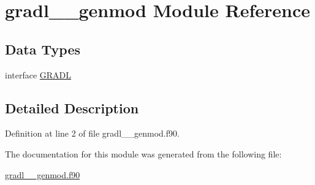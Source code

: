 \hypertarget{classgradl____genmod}{\section{gradl\+\_\+\+\_\+genmod Module Reference}
\label{classgradl____genmod}
}
\subsection*{Data Types}
\begin{DoxyCompactItemize}
\item 
interface \hyperlink{interfacegradl____genmod_1_1GRADL}{G\+R\+A\+D\+L}
\end{DoxyCompactItemize}


\subsection{Detailed Description}


Definition at line 2 of file gradl\+\_\+\+\_\+genmod.\+f90.



The documentation for this module was generated from the following file\+:\begin{DoxyCompactItemize}
\item 
\hyperlink{gradl____genmod_8f90}{gradl\+\_\+\+\_\+genmod.\+f90}\end{DoxyCompactItemize}
